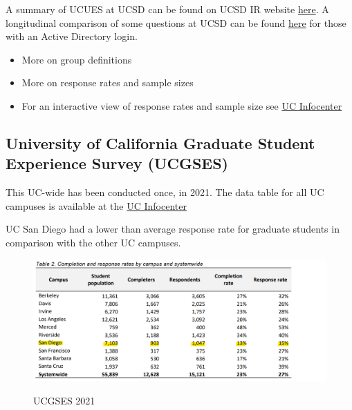 \documentclass[
  letterpaper,
  DIV=11,
  numbers=noendperiod]{scrreprt}
\begin{document}
A summary of UCUES at UCSD can be found on UCSD IR website
\href{https://ir.ucsd.edu/undergrad/surveys/index.html}{here}. A
longitudinal comparison of some questions at UCSD can be found
\href{https://tableau.ucsd.edu/\#/views/UCUES_UC_SanDiego/Satisfaction?:iid=1}{here}
for those with an Active Directory login.

\begin{itemize}
\item
  More on group definitions
\item
  More on response rates and sample sizes
\item
  For an interactive view of response rates and sample size see
  \href{https://www.universityofcalifornia.edu/about-us/information-center/student-survey-completion-and-response-rates}{UC
  Infocenter}
\end{itemize}

\hypertarget{sec-UCGSES}{%
\subsection{University of California Graduate Student Experience Survey
(UCGSES)}\label{sec-UCGSES}}

This UC-wide has been conducted once, in 2021. The data table for all UC
campuses is available at the
\href{https://www.universityofcalifornia.edu/about-us/information-center/UCGSES-data-tables}{UC
Infocenter}

UC San Diego had a lower than average response rate for graduate
students in comparison with the other UC campuses.

\begin{figure}

{\centering 

\href{https://www.ucop.edu/institutional-research-academic-planning/_files/survey-documents-graduate/ucgses-2021-administration-report.pdf}{\includegraphics{./viz/UCGSES_rr_table.png}}

}

\caption{UCGSES 2021}

\end{figure}
\end{document}
